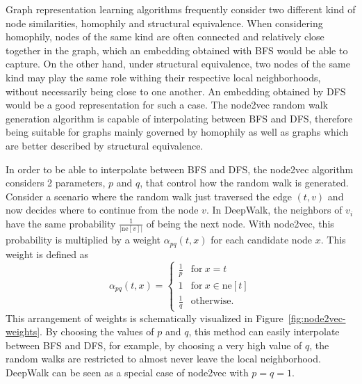 Graph representation learning algorithms frequently consider two different kind of node similarities, homophily and structural equivalence. When considering homophily, nodes of the same kind are often connected and relatively close together in the graph, which an embedding obtained with BFS would be able to capture. On the other hand, under structural equivalence, two nodes of the same kind may play the same role withing their respective local neighborhoods, without necessarily being close to one another. An embedding obtained by DFS would be a good representation for such a case. The node2vec random walk generation algorithm is capable of interpolating between BFS and DFS, therefore being suitable for graphs mainly governed by homophily as well as graphs which are better described by structural equivalence.

In order to be able to interpolate between BFS and DFS, the node2vec algorithm considers 2 parameters, \( p \) and \( q \), that control how the random walk is generated. Consider a scenario where the random walk just traversed the edge \( \left( t, v \right) \) and now decides where to continue from the node \( v \). In DeepWalk, the neighbors of \( v_i \) have the same probability \( \frac{1}{\left\lvert \mathrm{ne}[v] \right\rvert} \) of being the next node. With node2vec, this probability is multiplied by a weight \( \alpha_{pq} \left( t, x \right) \) for each candidate node \( x \). This weight is defined as
\begin{equation}\label{node2vec-weight}
	\alpha_{pq} \left( t, x \right) = \begin{cases}
		\frac{1}{p} & \text{for}\ x = t \\
		1 & \text{for}\ x \in \mathrm{ne}[t] \\
		\frac{1}{q} & \text{otherwise.}
	\end{cases}
\end{equation}
This arrangement of weights is schematically visualized in Figure~\ref{fig:node2vec-weights}. By choosing the values of \( p \) and \( q \), this method can easily interpolate between BFS and DFS, for example, by choosing a very high value of \( q \), the random walks are restricted to almost never leave the local neighborhood. DeepWalk can be seen as a special case of node2vec with \( p = q = 1 \).

